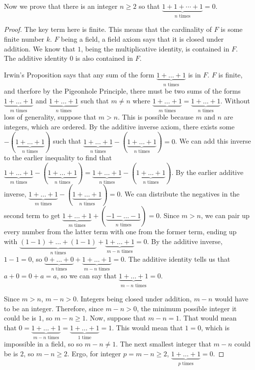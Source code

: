 \documentclass[11pt]{article}
\begin{document}
    Now we prove that there is an integer $n \geq 2$ so that $\underbrace{1 + 1 + \cdots + 1}_{n \text{ times}} = 0$.
    \begin{proof}
        The key term here is finite.
        This means that the cardinality of $F$ is some finite number $k$.
        $F$ being a field, a field axiom says that it is closed under addition.
        We know that $1$, being the multiplicative identity, is contained in $F$.
        The additive identity $0$ is also contained in $F$.

        Irwin's Proposition says that any sum of the form $\underbrace{1 + \dots + 1}_{n \text{ times}}$ is in $F$. 
        $F$ is finite, and therfore by the Pigeonhole Principle, there must be two sums of the forms $\underbrace{1 + \dots + 1}_{m \text{ times}}$ and $\underbrace{1 + \dots + 1}_{n \text{ times}}$ such that $m \neq n$ where $\underbrace{1 + \dots + 1}_{m \text{ times}} = \underbrace{1 + \dots + 1}_{n \text{ times}}$.
        Without loss of generality, suppose that $m > n$.
            This is possible because $m$ and $n$ are integers, which are ordered.
        By the additive inverse axiom, there exists some $-\left( \underbrace{1 + \dots + 1}_{n \text{ times}} \right)$ such that $\underbrace{1 + \dots + 1}_{n \text{ times}} - \left( \underbrace{1 + \dots + 1}_{n \text{ times}} \right) = 0$.
        We can add this inverse to the earlier inequality to find that $\underbrace{1 + \dots + 1}_{m \text{ times}} - \left( \underbrace{1 + \dots + 1}_{n \text{ times}} \right) = \underbrace{1 + \dots + 1}_{n \text{ times}} - \left( \underbrace{1 + \dots + 1}_{n \text{ times}} \right)$.
        By the earlier additive inverse, $\underbrace{1 + \dots + 1}_{m \text{ times}} - \left( \underbrace{1 + \dots + 1}_{n \text{ times}} \right) = 0$.
            We can distribute the negatives in the second term to get $\underbrace{1 + \dots + 1}_{m \text{ times}} + \left( \underbrace{-1 - \dots - 1}_{n \text{ times}} \right) = 0$.
            Since $m > n$, we can pair up every number from the latter term with one from the former term, ending up with $\underbrace{(1 - 1) + \dots + (1 - 1)}_{n \text{ times}} + \underbrace{1 + \dots + 1}_{m - n \text{ times}} = 0$.
            By the additive inverse, $1 - 1 = 0$, so $\underbrace{0 + \dots + 0}_{n \text{ times}} + \underbrace{1 + \dots + 1}_{m - n \text{ times}} = 0$.
            The additive identity tells us that $a + 0 = 0 + a = a$, so we can say that $\underbrace{1 + \dots + 1}_{m - n \text{ times}} = 0$.
        
        Since $m > n$, $m - n > 0$.
            Integers being closed under addition, $m - n$ would have to be an integer.
            Therefore, since $m - n > 0$, the minimum possible integer it could be is $1$, so $m - n \geq 1$.
        Now, suppose that $m - n = 1$.
        That would mean that $0 = \underbrace{1 + \dots + 1}_{m - n \text{ times}} = \underbrace{1 + \dots + 1}_{1 \text{ time}} = 1$.
        This would mean that $1 = 0$, which is impossible in a field, so so $m - n \neq 1$.
        The next smallest integer that $m - n$ could be is $2$, so $m - n \geq 2$.
        Ergo, for integer $p = m - n \geq 2$, $\underbrace{1 + \dots + 1}_{p \text{ times}} = 0$.
    \end{proof}
\end{document}
